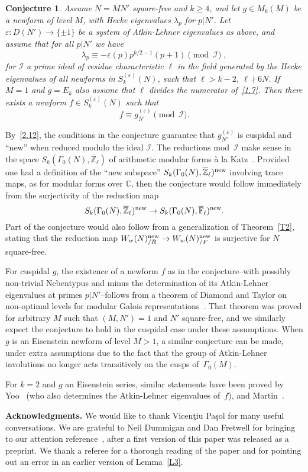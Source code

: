 \documentclass{amsart}
\theoremstyle{plain}
\newtheorem*{conj*}{Conjecture}
\theoremstyle{definition}
\numberwithin{equation}{section}
\newcommand{\Z}{{\mathbb Z}}
\newcommand{\C}{{\mathbb C}}
\def\I{\mathcal{I}} \def\J{\mathcal{J}} \def\LL{\mathcal{L}}
\def\e{\varepsilon} \def\DD{\Delta} \def\G{\Gamma}\def\om{\omega}
\def\ov#1{\overline{#1}}
\def\rar{\rightarrow}\def\FF{\mathbb{F}}
\begin{document}
\begin{conj*} Assume $N=MN'$ square-free and $k\ge 4$, and  let $g\in M_k(M)$ 
be a newform of level $M$, with Hecke eigenvalues $\lambda_p$ for $p|N'$. 
Let $\e:D(N')\rar \{\pm 1\}$ be a system of Atkin-Lehner eigenvalues as above, 
and assume that for all $p|N'$ we have 
$$\lambda_p \equiv -\e(p)p^{k/2-1}(p+1) \pmod \I \;,$$
for $\I$ a prime ideal of residue characteristic $\ell$ in the field 
generated by the Hecke eigenvalues of all newforms in $S_k^{(\e)}(N)$, such that 
$\ell>k-2$, $\ell\nmid 6N$. If $M=1$ and $g=E_k$ also assume 
that $\ell$ divides the numerator of~\eqref{1.7}. 
Then there exists a newform $f\in S_k^{(\e)}(N)$ such that
\[f\equiv g_{N'}^{(\e)} \pmod \I. \]
\end{conj*}
By~\eqref{2.12}, the conditions in the conjecture guarantee that $g_{N'}^{(\e)}$ 
is cuspidal and ``new'' when reduced modulo the ideal $\I$. The reductions mod~$\I$
make sense in the space $S_k(\G_0(N), \ov{\Z}_\ell)$ of arithmetic modular forms 
\`a la Katz~\cite{Ed}. Provided 
one had a definition of the ``new subspace'' $S_k(\G_0(N), \ov{\Z}_\ell)^\new$ 
involving trace maps, as for modular forms over $\C$, then the conjecture 
would follow immediately from the surjectivity of the reduction map 
\[S_k(\G_0(N), \ov{\Z}_\ell)^\new \rar S_k(\G_0(N), \ov{\FF}_\ell)^\new . 
\]
Part of the conjecture would also follow from a generalization of Theorem~\ref{T2}, stating that the 
reduction map $W_{w}(N)^{\new}_{/R} \rar W_{w}(N)^{\new}_{/F}$
is surjective for $N$ square-free. 

For cuspidal $g$, the existence of a newform $f$ as in the conjecture--with possibly non-trivial 
Nebentypus and minus the determination
of its Atkin-Lehner eigenvalues at primes $p|N'$--follows from a theorem of 
Diamond and Taylor on non-optimal levels for modular Galois 
representations~\cite{DT}.  That theorem was proved for arbitrary $M$ 
such that $(M,N')=1$ and $N'$ square-free, and we similarly 
expect the conjecture to hold in the cuspidal case under these assumptions. 
When $g$ is an Eisenstein newform of level $M>1$, a similar conjecture can be 
made, under extra assumptions due to the fact that the group of Atkin-Lehner involutions
no longer acts transitively on the cusps of~$\G_0(M)$.

For $k=2$ and $g$ an Eisenstein series, similar 
statements have been proved by Yoo~\cite{Yo} (who also determines the  
Atkin-Lehner eigenvalues of~$f$), and Martin~\cite{Mar}.


{\bf Acknowledgments.} We would like to thank Vicen\c tiu Pa\c sol 
for many useful conversations. We are grateful to Neil Dummigan and 
Dan Fretwell for bringing to our attention reference~\cite{BM}, after a first
version of this paper was released as a preprint. 
We thank a referee for a thorough reading of the paper and for pointing out an error in 
an earlier version of Lemma~\ref{L3}.
\end{document}
